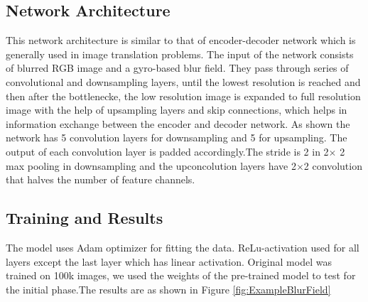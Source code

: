 \documentclass[10pt,twocolumn,letterpaper]{article}
\begin{document}
\subsection{Network Architecture}
This network architecture is similar to that of encoder-decoder network which is generally used in image translation problems. The input of the network consists of blurred RGB image and a gyro-based blur field. They pass through series of convolutional and downsampling layers, until the lowest resolution is reached and then after the bottlenecke, the low resolution image is expanded to full resolution image with the help of upsampling layers and skip connections, which helps in information exchange between the encoder and decoder network.
As shown the network has 5 convolution layers for downsampling and 5 for upsampling. The output of each convolution layer is padded accordingly.The stride is 2 in 2$\times$ 2 max pooling in downsampling and the upconcolution layers have 2$\times$2 convolution that halves the number of feature channels. 

\subsection{Training and Results}

The model uses Adam optimizer for fitting the data. ReLu-activation used for all layers except the last layer which has linear activation. Original model was trained on 100k images, we used the weights of the pre-trained model to test for the initial phase.The results are as shown in Figure \ref{fig:ExampleBlurField}
\end{document}
